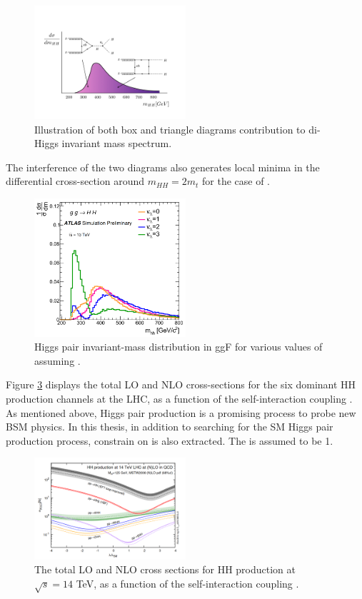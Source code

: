 \begin{figure}[htbp]
    \centering
    \includegraphics[width=0.5\textwidth]{Ch1/Img/illustration_mHH.jpeg}
    \caption{Illustration of both box and triangle diagrams contribution to di-Higgs invariant mass spectrum.}
    \label{fig:chap1:HH:BSM:I}
\end{figure}
The interference of the two diagrams also generates local minima in the differential cross-section around $m_{HH}=2m_t$ for the case of .
\begin{figure}[htbp]
    \centering
    \includegraphics[width=0.5\textwidth]{Ch1/Img/mHH.png}
    \caption{Higgs pair invariant-mass distribution in ggF for various values of \kl assuming .}
    \label{fig:chap1:HH:BSM:MHH}
\end{figure}
Figure \ref{fig:chap1:HH:BSM:XSEC:L} displays the total LO and NLO cross-sections for the six dominant HH production channels at the LHC, as a function of the self-interaction coupling \kl.  As mentioned above, Higgs pair production is a promising process to probe new BSM physics. In this thesis, in addition to searching for the SM Higgs pair production process, constrain on \kl is also extracted. The \kt is assumed to be 1.
\begin{figure}[htbp]
    \centering
    \includegraphics[width=0.5\textwidth]{Ch1/Img/HH_Xsec_as_lambda.png}
    \caption{The total LO and NLO cross sections for HH production at $\sqrt{s}=14$ TeV, as a function of the self-interaction coupling \kl.}
    \label{fig:chap1:HH:BSM:XSEC:L}
\end{figure}

